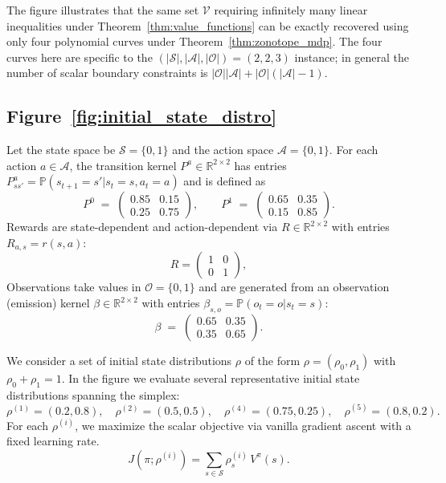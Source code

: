 \documentclass{article}
\theoremstyle{definition}
\theoremstyle{remark}
\begin{document}
The figure illustrates that the same set $\mathcal{V}$ requiring infinitely many linear inequalities under Theorem~\ref{thm:value_functions} can be exactly recovered using only four polynomial curves under Theorem~\ref{thm:zonotope_mdp}. The four curves here are specific to the $(|\mathcal{S}|, |\mathcal{A}|, |\mathcal{O}|) = (2, 2, 3)$ instance; in general the number of scalar boundary constraints is $|\mathcal{O}||\mathcal{A}| + |\mathcal{O}|(|\mathcal{A}| - 1)$.


\subsection{Figure~\ref{fig:initial_state_distro}}

Let the state space be $\mathcal S=\{0,1\}$ and the action space $\mathcal A=\{0,1\}$.
For each action $a\in\mathcal A$, the transition kernel $P^a\in\mathbb R^{2\times 2}$ has entries
$P^a_{ss'}=\mathbb P(s_{t+1}=s' |  s_t=s,a_t=a)$ and is defined as
\[
P^0 \;=\;\begin{pmatrix}
0.85 & 0.15\\
0.25 & 0.75
\end{pmatrix},\qquad
P^1
\;=\;\begin{pmatrix}
0.65 & 0.35\\
0.15 & 0.85
\end{pmatrix}.
\]
Rewards are state-dependent and action-dependent via $R\in\mathbb R^{2\times 2}$ with entries
$R_{a,s}=r(s,a)$:
$$
R =\begin{pmatrix}
1 & 0\\
0 & 1
\end{pmatrix},
$$
Observations take values in $\mathcal O=\{0,1\}$ and are generated from an observation (emission) kernel
$\beta\in\mathbb R^{2\times 2}$ with entries $\beta_{s,o}=\mathbb P(o_t=o |  s_t=s)$:
$$
\beta \;=\;\begin{pmatrix}
0.65 & 0.35\\
0.35 & 0.65
\end{pmatrix}.
$$


We consider a set of initial state distributions $\rho$ of the form
$\rho=(\rho_0,\rho_1)$ with $\rho_0+\rho_1=1$.
In the figure we evaluate several representative initial state distributions spanning the simplex:
$$
\rho^{(1)}=(0.2,0.8),\quad
\rho^{(2)}=(0.5,0.5),\quad
\rho^{(4)}=(0.75,0.25),\quad
\rho^{(5)}=(0.8,0.2).
$$
For each $\rho^{(i)}$, we maximize the scalar objective via vanilla gradient ascent with a fixed learning rate.
$$
    J(\pi;\rho^{(i)}) =  \sum_{s\in\mathcal S}\rho^{(i)}_s\, V^\pi(s).
$$
\end{document}
